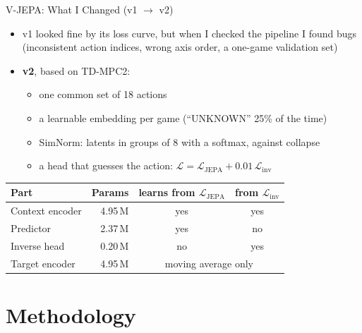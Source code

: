 \documentclass[aspectratio=43,10pt]{beamer}
\begin{document}
\begin{frame}{V-JEPA: What I Changed (v1 $\rightarrow$ v2)}
  \begin{itemize}\setlength\itemsep{0.3em}
    \item v1 looked fine by its loss curve, but when I checked the pipeline I found bugs
          (inconsistent action indices, wrong axis order, a one-game validation set)
    \item \textbf{v2}, based on TD-MPC2:
      \begin{itemize}\small
        \item one common set of 18 actions
        \item a learnable embedding per game (``UNKNOWN'' 25\% of the time)
        \item SimNorm: latents in groups of 8 with a softmax, against collapse
        \item a head that guesses the action: $\mathcal{L}=\mathcal{L}_{\text{JEPA}}+0.01\,\mathcal{L}_{\text{inv}}$
      \end{itemize}
  \end{itemize}
  \vspace{0.3em}
  \centering
  {\footnotesize
  \begin{tabular}{@{}lrcc@{}}
    \toprule
    Part & Params & learns from $\mathcal{L}_{\text{JEPA}}$ & from $\mathcal{L}_{\text{inv}}$ \\
    \midrule
    Context encoder & 4.95\,M & yes & yes \\
    Predictor & 2.37\,M & yes & no \\
    Inverse head & 0.20\,M & no & yes \\
    Target encoder & 4.95\,M & \multicolumn{2}{c}{moving average only} \\
    \bottomrule
  \end{tabular}}
\end{frame}

\section{Methodology}
\end{document}
